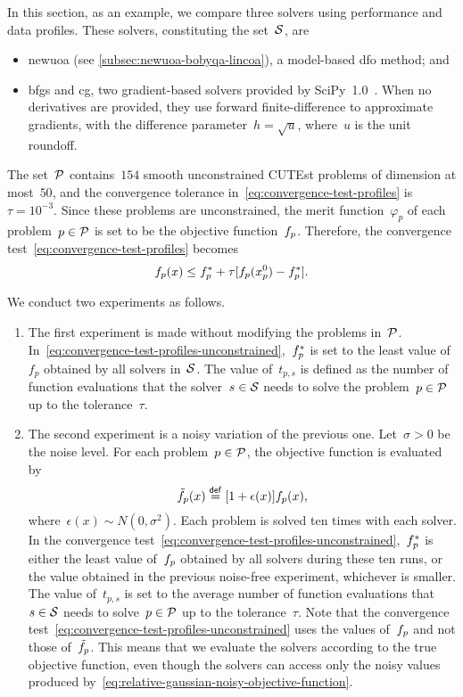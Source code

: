 In this section, as an example, we compare three solvers using performance and data profiles.
These solvers, constituting the set~$\mathcal{S}$, are
\begin{itemize}
    \item \gls{newuoa} (see \cref{subsec:newuoa-bobyqa-lincoa}), a model-based \gls{dfo} method; and
    \item \gls{bfgs} and \gls{cg}, two gradient-based solvers provided by SciPy~1.0~\cite{Virtanen_Etal_2020}.
    When no derivatives are provided, they use forward finite-difference to approximate gradients, with the difference parameter~$h = \sqrt{u}$, where~$u$ is the unit roundoff.
\end{itemize}
The set~$\mathcal{P}$ contains~$154$ smooth unconstrained CUTEst problems of dimension at most~$50$, and the convergence tolerance in~\cref{eq:convergence-test-profiles} is~$\tau = 10^{-3}$.
Since these problems are unconstrained, the merit function~$\varphi_p$ of each problem~$p \in \mathcal{P}$ is set to be the objective function~$f_p$.
Therefore, the convergence test~\cref{eq:convergence-test-profiles} becomes
\begin{equation}
    \label{eq:convergence-test-profiles-unconstrained}
    f_p(x) \le f_p^{\ast} + \tau [f_p(x_p^0) - f_p^{\ast}].
\end{equation}

We conduct two experiments as follows.
\begin{enumerate}
    \item The first experiment is made without modifying the problems in~$\mathcal{P}$.
    In~\cref{eq:convergence-test-profiles-unconstrained},~$f_p^{\ast}$ is set to the least value of~$f_p$ obtained by all solvers in~$\mathcal{S}$.
    The value of~$t_{p, s}$ is defined as the number of function evaluations that the solver~$s \in \mathcal{S}$ needs to solve the problem~$p \in \mathcal{P}$ up to the tolerance~$\tau$.
    \item The second experiment is a noisy variation of the previous one.
    Let~$\sigma > 0$ be the noise level.
    For each problem~$p \in \mathcal{P}$, the objective function is evaluated by
    \begin{equation}
        \label{eq:relative-gaussian-noisy-objective-function}
        \tilde{f}_p(x) \mathrel{\stackrel{\mathsf{def}}{=}} [1 + \epsilon(x)] f_p(x),
    \end{equation}
    where~$\epsilon(x) \sim N(0, \sigma^2)$.
    Each problem is solved ten times with each solver.
    In the convergence test~\cref{eq:convergence-test-profiles-unconstrained},~$f_p^{\ast}$ is either the least value of~$f_p$ obtained by all solvers during these ten runs, or the value obtained in the previous noise-free experiment, whichever is smaller.
    The value of~$t_{p, s}$ is set to the average number of function evaluations that~$s \in \mathcal{S}$ needs to solve~$p \in \mathcal{P}$ up to the tolerance~$\tau$.
    Note that the convergence test~\cref{eq:convergence-test-profiles-unconstrained} uses the values of~$f_p$ and not those of~$\tilde{f}_p$.
    This means that we evaluate the solvers according to the true objective function, even though the solvers can access only the noisy values produced by~\cref{eq:relative-gaussian-noisy-objective-function}.
\end{enumerate}

